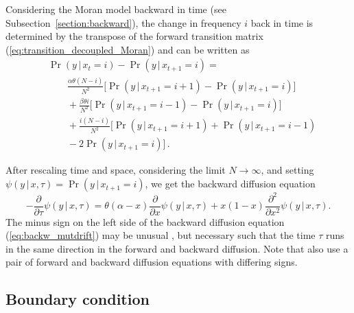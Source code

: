 \documentclass[preprint]{elsarticle}
\newcommand\given{{\,|\,}}
\newcommand\x[1]{\ensuremath{x_{#1}}}
\newcommand\y{\ensuremath{y}}
\begin{document}
Considering the Moran model backward in time (see Subsection~\ref{section:backward}), the change in frequency $i$ back in time is determined by the transpose of the forward transition matrix (\ref{eq:transition_decoupled_Moran}) and can be written as
\begin{equation}\label{eq:back_discr_mutation}
\begin{split}
&\Pr(\y \given\x{t}=i)-\Pr(\y\given\x{t+1}=i) = \\
&\qquad \frac{\alpha \theta (N-i)}{N^2} \bigg[\Pr(\y\given\x{t+1}=i+1)-\Pr(y\given\x{t+1}=i)\bigg]\\
&\qquad+ \frac{\beta \theta i}{N^2} \bigg[\Pr(\y\given\x{t+1}=i-1)-\Pr(\y\given\x{t+1}=i)\bigg]\\
&\qquad+ \frac{i(N-i)}{N^2} \bigg[\Pr(\y\given\x{t+1}=i+1)+\Pr(\y\given\x{t+1}=i-1)\\
&\qquad-2\Pr(\y\given\x{t+1}=i)\bigg]\,.
\end{split}
\end{equation}

After rescaling time and space, considering the limit $N \to \infty$, and setting $\psi(\y\given x,\tau)=\Pr(\y\given \x{t+1}=i)$, we get the backward diffusion equation
\begin{equation}\label{eq:backw_mutdrift}
-\frac{\partial}{\partial \tau} \psi(\y\given x,\tau) =
    \theta(\alpha-x)\frac{\partial}{\partial x} \psi(\y\given x,\tau) +x(1-x)\frac{\partial^2}{\partial x^2}\psi(\y\given x,\tau).
\end{equation}
The minus sign on the left side of the backward diffusion equation (\ref{eq:backw_mutdrift}) may be unusual \citep[compare][]{Ewen04}, but necessary such that the time $\tau$ runs in the same direction in the forward and backward diffusion. Note that \citet{Zhao13a} also use a pair of forward and backward diffusion equations with differing signs.

\subsection{Boundary condition}\label{section:is_adjoint?}
\end{document}
